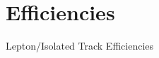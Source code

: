 \documentclass{beamer}
\begin{document}
%  
\section{Efficiencies}
\begin{frame}
 \begin{block}{}
 \centering
 \Large Lepton/Isolated Track Efficiencies
 \end{block}
\end{frame}
\end{document}
